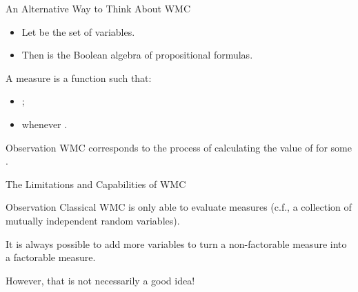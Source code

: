 \documentclass{beamer}
\begin{document}
\begin{frame}{An Alternative Way to Think About WMC}
  \begin{itemize}
  \item Let  be the set of variables.
  \item Then  is the Boolean algebra of propositional
    formulas.
  \end{itemize}
  \begin{definition}
    A \alert{measure} is a function  such that:
    \begin{itemize}
    \item {};
    \item {} whenever .
    \end{itemize}
  \end{definition}
  \begin{block}{Observation}
    WMC corresponds to the process of calculating the value of
     for some .
  \end{block}
\end{frame}


\begin{frame}{The Limitations and Capabilities of WMC}
  \begin{alertblock}{Observation}
    Classical WMC is only able to evaluate  measures
    (c.f., a collection of mutually independent random variables).
  \end{alertblock}
  \begin{theorem}
    It is always possible to add more variables to turn a non-factorable measure
    into a factorable measure.
  \end{theorem}
  However, that is not necessarily a good idea!
\end{frame}
\end{document}
